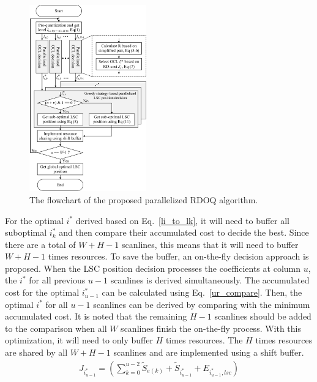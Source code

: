 \documentclass[lettersize,journal]{IEEEtran}
\begin{document}
\par
\begin{figure}[!ht]
	\centering
	\centerline{\includegraphics[width=0.45\textwidth]{figure/ProRDOQ.png}} 
	\caption{The flowchart of the proposed parallelized RDOQ algorithm.}
	\label{ProRDOQ} %
\end{figure}
For the optimal $i^{*}$ derived based on Eq.~\eqref{li_to_lk}, it will need to buffer all suboptimal $i_{k}^{*}$ and then compare their accumulated cost to decide the best. Since there are a total of $W+H-1$ scanlines, this means that it will need to buffer $W+H-1$ times resources. To save the buffer, an on-the-fly decision approach is proposed. When the LSC position decision processes the coefficients at column $u$, the $i^{*}$ for all previous $u-1$ scanlines is derived simultaneously. The accumulated cost for the optimal $i_{u-1}^{*}$ can be calculated using Eq.~\eqref{ur_compare}. Then, the optimal $i^{*}$ for all $u-1$ scanlines can be derived by comparing with the minimum accumulated cost. It is noted that the remaining $H-1$ scanlines should be added to the comparison when all $W$ scanlines finish the on-the-fly process. With this optimization, it will need to only buffer $H$ times resources. The $H$ times resources are shared by all $W+H-1$ scanlines and are implemented using a shift buffer. 
\begin{equation}
	\begin{aligned}
	\label{ur_compare}
	J_{i_{u-1 }^{*}} = \left ( \sum_{k=0}^{u-2} \widetilde{S}_{e(k)} + \widetilde{S}_{i_{u-1 }^{*}} + E_{i_{u-1 }^{*},lsc}   \right) 
\end{aligned}
\end{equation}
\end{document}
